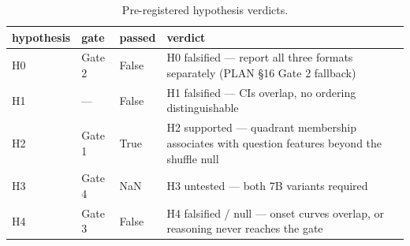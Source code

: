\begin{table}
\caption{Pre-registered hypothesis verdicts.}
\label{tab:t15_hypothesis_verdicts}
\begin{tabular}{llll}
\toprule
hypothesis & gate & passed & verdict \\
\midrule
H0 & Gate 2 & False & H0 falsified — report all three formats separately (PLAN §16 Gate 2 fallback) \\
H1 & — & False & H1 falsified — CIs overlap, no ordering distinguishable \\
H2 & Gate 1 & True & H2 supported — quadrant membership associates with question features beyond the shuffle null \\
H3 & Gate 4 & NaN & H3 untested — both 7B variants required \\
H4 & Gate 3 & False & H4 falsified / null — onset curves overlap, or reasoning never reaches the gate \\
\bottomrule
\end{tabular}
\end{table}

